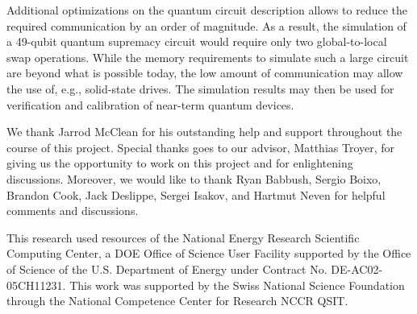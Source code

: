 \documentclass[sigconf]{acmart}
\begin{document}
Additional optimizations on the quantum circuit description allows to reduce the required communication by an order of magnitude. As a result, the simulation of a 49-qubit quantum supremacy circuit would require only two global-to-local swap operations. While the memory requirements to simulate such a large circuit are beyond what is possible today, the low amount of communication may allow the use of, e.g., solid-state drives. The simulation results may then be used for verification and calibration of near-term quantum devices.


\begin{acks}
We thank Jarrod McClean for his outstanding help and support throughout the course of this project. Special thanks goes to our advisor, Matthias Troyer, for giving us the opportunity to work on this project and for enlightening discussions. Moreover, we would like to thank Ryan Babbush, Sergio Boixo, Brandon Cook, Jack Deslippe, Sergei Isakov, and Hartmut Neven for helpful comments and discussions.

This research used resources of the National Energy Research Scientific Computing Center, a DOE Office of Science User Facility supported by the Office of Science of the U.S. Department of Energy under Contract No. DE-AC02-05CH11231. This work was supported by the Swiss National Science Foundation through the National Competence Center for Research NCCR QSIT.
\end{acks}





 
\end{document}
